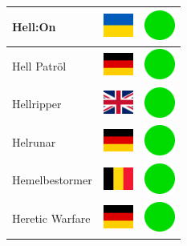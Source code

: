 \documentclass[12pt, a4paper, twoside]{report}
\begin{document}
\begin{center}
\begin{longtable}{|p{5cm}|p{2cm}|p{2cm}|}
 Hell:On                                                    & \includegraphics[width=1cm]{../img/flags/ua} &   \includegraphics[width=1cm]{../likes/y} \\ \hline
 Hell Patröl                                                & \includegraphics[width=1cm]{../img/flags/de} &   \includegraphics[width=1cm]{../likes/y} \\ \hline
 Hellripper                                                 & \includegraphics[width=1cm]{../img/flags/gb} &   \includegraphics[width=1cm]{../likes/y} \\ \hline
 Helrunar                                                   & \includegraphics[width=1cm]{../img/flags/de} &   \includegraphics[width=1cm]{../likes/y} \\ \hline
 Hemelbestormer                                             & \includegraphics[width=1cm]{../img/flags/be} &   \includegraphics[width=1cm]{../likes/y} \\ \hline
 Heretic Warfare                                            & \includegraphics[width=1cm]{../img/flags/de} &   \includegraphics[width=1cm]{../likes/y} \\ \hline

\end{longtable}
\end{center}
\end{document}

